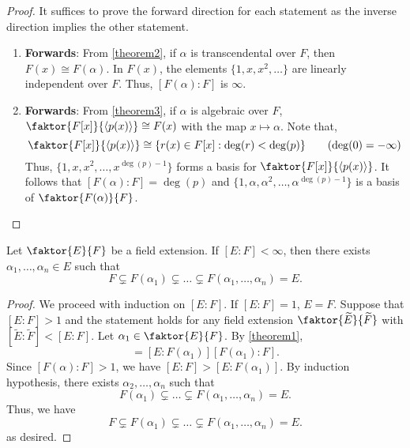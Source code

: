 \documentclass[11pt]{article}
\newcommand{\cyclic}[1]{\left\langle #1 \right\rangle}
\newcommand{\quotient}[2]{\faktor{#1}{#2}}
\begin{document}
\begin{proof}
It suffices to prove the forward direction for each statement as the inverse
direction implies the other statement.
\begin{enumerate}
\item {\bf Forwards}: From \cref{theorem2}, if $\alpha$ is transcendental over
$F$, then $F(x) \cong F(\alpha)$. In $F(x)$, the elements $\{1, x, x^2, \dots\}$
are linearly independent over $F$. Thus, $[F(\alpha):F]$ is $\infty$.\\
\item {\bf Forwards}: From \cref{theorem3}, if $\alpha$ is algebraic over $F$,
$\quotient{F[x]}{\cyclic{p(x)}} \cong F(x)$ with the map $x \mapsto \alpha$.
Note that,
\begin{equation*}
\quotient{F[x]}{\cyclic{p(x)}} \cong \{r(x) \in F[x]: \deg(r) < \deg(p)\}
\tag{$\deg(0) = -\infty$}
\end{equation*}
Thus, $\{1, x, x^2, \dots, x^{\deg(p) - 1}\}$ forms a basis for
$\quotient{F[x]}{\cyclic{p(x)}}$. It follows that $[F(\alpha): F] =
\deg(p)$ and $\{1, \alpha, \alpha^2, \dots,
\alpha^{\deg (p) - 1}\}$ is a basis of $\quotient{F(\alpha)}{F}$.
\end{enumerate}
\end{proof}
\begin{theorem}\label{theorem5}
Let $\quotient{E}{F}$ be a field extension. If $[E:F] < \infty$, then there
exists $\alpha_1, \dots, \alpha_n \in E$ such that
\begin{equation*}
F \subsetneq F(\alpha_1) \subsetneq \dots \subsetneq F(\alpha_1, \dots,
\alpha_n) = E.
\end{equation*}
\end{theorem}
\begin{proof}
We proceed with induction on $[E:F]$. If $[E:F] = 1$, $E=F$. Suppose that $[E:F]
> 1$ and the statement holds for any field extension $\quotient{\tilde
E}{\tilde F}$ with $[\tilde E : \tilde F] < [E:F]$. Let $\alpha_1 \in
\quotient{E}{F}$. By \cref{theorem1},
\begin{equation*}
[E:F] = [E:F(\alpha_1)][F(\alpha_1) : F].
\end{equation*}
Since $[F(\alpha):F] > 1$, we have $[E:F] > [E:F(\alpha_1)]$. By induction
hypothesis, there exists $\alpha_2, \dots, \alpha_n$ such that
\begin{equation*}
F(\alpha_1) \subsetneq \dots \subsetneq F(\alpha_1, \dots, \alpha_n) = E.
\end{equation*}
Thus, we have
\begin{equation*}
F \subsetneq F(\alpha_1) \subsetneq \dots \subsetneq F(\alpha_1, \dots,
\alpha_n) = E.
\end{equation*}
as desired.
\end{proof}
\end{document}
